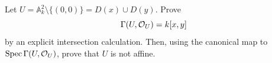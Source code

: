 \begin{problem}\label{chal:vi18-c01}
Let $U=\mathbb A^2_k\setminus\{(0,0)\}=D(x)\cup D(y)$.  Prove
\[
\Gamma(U,\mathcal O_U)=k[x,y]
\]
by an explicit intersection calculation.  Then, using the canonical map to
$\operatorname{Spec}\Gamma(U,\mathcal O_U)$, prove that $U$ is not affine.
\end{problem}
